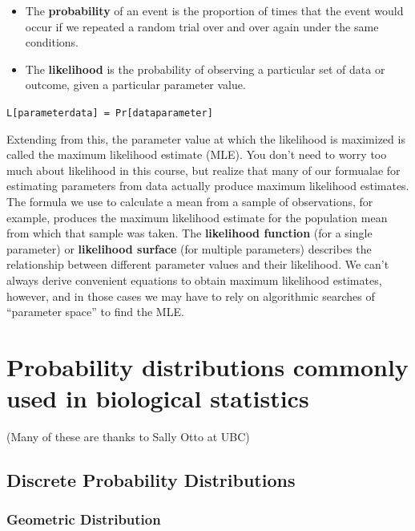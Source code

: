 \documentclass[]{book}
\begin{document}
\begin{itemize}
\item
  The \textbf{probability} of an event is the proportion of times that the event would occur if we repeated a random trial over and over again under the same conditions.
\item
  The \textbf{likelihood} is the probability of observing a particular set of data or outcome, given a particular parameter value.
\end{itemize}

\texttt{L{[}parameter\textbar{}data{]}\ =\ Pr{[}data\textbar{}parameter{]}}

Extending from this, the parameter value at which the likelihood is maximized is called the maximum likelihood estimate (MLE). You don't need to worry too much about likelihood in this course, but realize that many of our formualae for estimating parameters from data actually produce maximum likelihood estimates. The formula we use to calculate a mean from a sample of observations, for example, produces the maximum likelihood estimate for the population mean from which that sample was taken. The \textbf{likelihood function} (for a single parameter) or \textbf{likelihood surface} (for multiple parameters) describes the relationship between different parameter values and their likelihood. We can't always derive convenient equations to obtain maximum likelihood estimates, however, and in those cases we may have to rely on algorithmic searches of ``parameter space'' to find the MLE.

\hypertarget{probability-distributions-commonly-used-in-biological-statistics}{%
\section{Probability distributions commonly used in biological statistics}\label{probability-distributions-commonly-used-in-biological-statistics}}

(Many of these are thanks to Sally Otto at UBC)

\hypertarget{discrete-probability-distributions}{%
\subsection{Discrete Probability Distributions}\label{discrete-probability-distributions}}

\hypertarget{geometric-distribution}{%
\subsubsection{\texorpdfstring{\textbf{Geometric Distribution}}{Geometric Distribution}}\label{geometric-distribution}}
\end{document}

